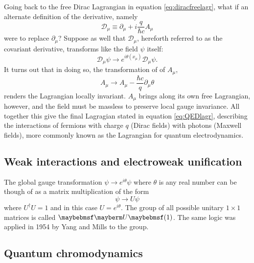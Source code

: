 Going back to the free Dirac Lagrangian in equation \ref{eq:diracfreelagr}, what if an alternate definition of the derivative, namely 
\begin{equation}
    \mathcal{D}_{\mu}\equiv \partial_{\mu}+i\dfrac{q}{\hbar c}A_{\mu}
\end{equation}
were to replace $\partial_{\mu}$? Suppose as well that $\mathcal{D}_{\mu}$, hereforth referred to as the covariant derivative, transforms like the field $\psi$ itself:
\begin{equation}
    \mathcal{D}_{\mu}\psi\rightarrow e^{i\theta(x_{\mu})}\mathcal{D}_{\mu}\psi .
\end{equation}
It turns out that in doing so, the transformation of of $A_{\mu}$, 
\begin{equation}
    A_{\mu}\rightarrow A_{\mu}-\dfrac{\hbar c}{q}\partial_{\mu}\theta
\end{equation}
renders the Lagrangian locally invariant. $A_{\mu}$ brings along its own free Lagrangian, however, and the field must be massless to preserve local gauge invariance. All together this give the final Lagragian stated in equation \ref{eq:QEDlagr}, describing the interactions of fermions with charge $q$ (Dirac fields) with photons (Maxwell fields), more commonly known as the Lagrangian for quantum electrodynamics. 
\subsection{Weak interactions and electroweak unification}

The global gauge transformation $\psi\rightarrow e^{i\theta}\psi$ where $\theta$ is any real number can be though of as a matrix multiplication of the form
\begin{equation}
    \psi\rightarrow U\psi
\end{equation}
where $U^{\dag}U=1$ and in this case $U=e^{i\theta}$. The group of all possible unitary $1\times1$ matrices is called $\Ugroup{1}$. The same logic was applied in 1954 by Yang and Mills to the  group.

\subsection{Quantum chromodynamics}


